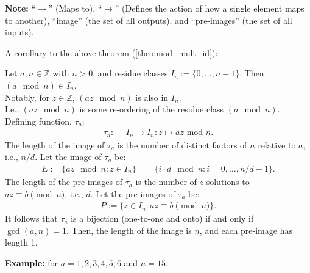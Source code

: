 \newpage

\begin{Note}
    \textbf{Note:} ``$\rightarrow$'' (Maps to), ``$\mapsto$'' (Defines the action of how a single element maps to another), ``image'' (the set of all outputs), and ``pre-images'' (the set of all inputs).
\end{Note}

\noindent
A corollary to the above theorem (\ref{theo:mod_mult_id}):
\begin{theo}

    \label{theo:mod_mult_map}

    Let $a,n\in \mathbb{Z}$ with $n>0$, and residue classes $I_n:=\{0,\dots,n-1\}$. Then $(a \mod n)\in I_n$.\\
    Notably, for $z\in\mathbb{Z}$, $(az \mod n)$ is also in $I_n$.\\

    \noindent
    I.e., $(az \mod n)$ is some re-ordering of the residue class $(a \mod n)$. Defining function, $\tau_a$:
    \begin{align*}
        \tau_a:&\enspace I_n \rightarrow I_n: z \mapsto az \text{ mod } n. \tag{3.2.1}
    \end{align*}
    The length of the image of $\tau_a$ is the number of distinct factors of $n$ relative to $a$, i.e., $n/d$. Let the image of $\tau_a$ be:
    \begin{align*}
        E := \{az \mod n : z \in I_n\} &= \{i \cdot d \mod n : i = 0, \dots, n/d - 1\}. \tag{3.2.2}
    \end{align*}
    The length of the pre-images of $\tau_a$ is the number of $z$ solutions to $az\equiv b \pmod{n}$, i.e., $d$. Let the pre-images of $\tau_a$ be:
    \begin{align*}
        P := \{z \in I_n : az \equiv b \pmod{n}\}. \tag{3.2.3}
    \end{align*}
    It follows that $\tau_a$ is a bijection (one-to-one and onto) if and only if $\gcd(a, n) = 1$. Then, the length of the image is $n$, and each pre-image has length 1.

\end{theo}
\textbf{Example:} for $a=1,2,3,4,5,6$ and $n=15$,

